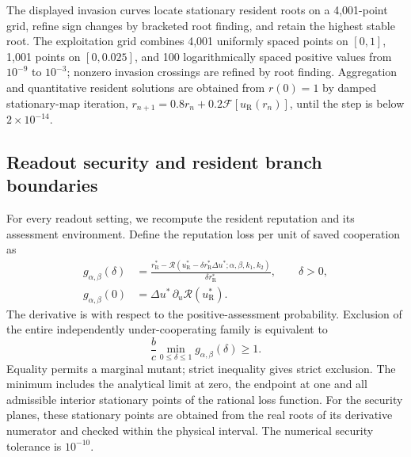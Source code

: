 \documentclass[fleqn,10pt]{article}
\begin{document}
The displayed invasion curves locate stationary resident roots on a 4,001-point grid, refine sign changes by bracketed root finding, and retain the highest stable root. The exploitation grid combines 4,001 uniformly spaced points on $[0,1]$, 1,001 points on $[0,0.025]$, and 100 logarithmically spaced positive values from $10^{-9}$ to $10^{-3}$; nonzero invasion crossings are refined by root finding. Aggregation and quantitative resident solutions are obtained from $r(0)=1$ by damped stationary-map iteration, $r_{n+1}=0.8r_n+0.2\mathcal F[u_{\mathrm R}(r_n)]$, until the step is below $2\times10^{-14}$.

\subsection*{Readout security and resident branch boundaries}

For every readout setting, we recompute the resident reputation and its assessment environment. Define the reputation loss per unit of saved cooperation as
\begin{equation}
\begin{aligned}
g_{\alpha,\beta}(\delta)
&=\frac{r_{\mathrm R}^*-\mathcal R\!\left(u_{\mathrm R}^*-\delta r_{\mathrm R}^*\Delta u^*;\alpha,\beta,k_1,k_2\right)}
{\delta r_{\mathrm R}^*},\qquad \delta>0,\\
g_{\alpha,\beta}(0)&=\Delta u^*\,\partial_u\mathcal R(u_{\mathrm R}^*).
\end{aligned}
\label{eq:methods-readout-penalty}
\end{equation}
The derivative is with respect to the positive-assessment probability. Exclusion of the entire independently under-cooperating family is equivalent to
\begin{equation}
\frac bc\min_{0\leq\delta\leq1}g_{\alpha,\beta}(\delta)\geq1.
\label{eq:methods-global-security}
\end{equation}
Equality permits a marginal mutant; strict inequality gives strict exclusion. The minimum includes the analytical limit at zero, the endpoint at one and all admissible interior stationary points of the rational loss function. For the security planes, these stationary points are obtained from the real roots of its derivative numerator and checked within the physical interval. The numerical security tolerance is $10^{-10}$.
\end{document}
